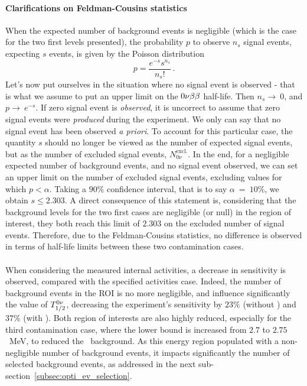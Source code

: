 \paragraph{Clarifications on Feldman-Cousins statistics}
When the expected number of background events is negligible (which is the case for the two first levels presented), the probability $p$ to observe $n_{s}$ signal events, expecting $s$ events, is given by the Poisson distribution
\begin{equation}
p = \frac{e^{-s}s^{n_{s}}}{n_{s}!}\,.
\end{equation}
Let's now put ourselves in the situation where no signal event is observed - that is what we assume to put an upper limit on the $0\nu\beta\beta$ half-life.
Then $n_{s}\rightarrow~0$, and $p\rightarrow~e^{-s}$.
If zero signal event is \emph{observed}, it is uncorrect to assume that zero signal events were \emph{produced} during the experiment.
We only can say that no signal event has been observed \emph{a priori}.
To account for this particular case, the quantity $s$ should no longer be viewed as the number of expected signal events, but as the number of excluded signal events, $N_{0\nu}^{\text{excl.}}$.
In the end, for a negligible expected number of background events, and no signal event observed, we can set an upper limit on the number of excluded signal events, excluding values for which $p < \alpha$.
Taking a $90\%$ confidence interval, that is to say $\alpha~=~10\%$, we obtain $s \leq 2.303$.
A direct consequence of this statement is, considering that the background levels for the two first cases are negligible (or null) in the region of interest, they both reach this limit of $2.303$ on the excluded number of signal events.
Therefore, due to the Feldman-Cousins statistics, no difference is observed in terms of half-life limits between these two contamination cases.

\paragraph{}
When considering the measured internal activities, a decrease in sensitivity is observed, compared with the specified activities case.
Indeed, the number of background events in the ROI is no more negligible, and influence significantly the value of $T_{1/2}^{0\nu}$, decreasing the experiment's sensitivity by $23\%$ (without \Bi) and $37\%$ (with \Bi).
Both region of interests are also highly reduced, especially for the third contamination case, where the lower bound is increased from $2.7$ to $2.75$~MeV, to reduced the \Bi\ background.
As this energy region populated with a non-negligible number of background events, it impacts significantly the number of selected background events, as addressed in the next sub-section~\ref{subsec:opti_ev_selection}.


